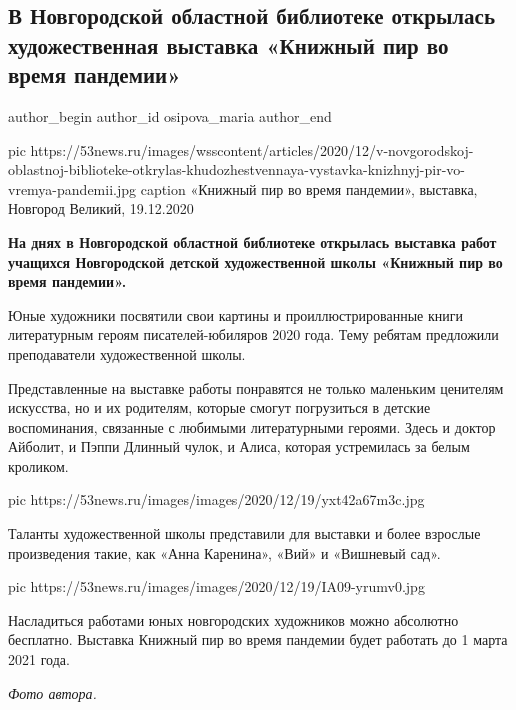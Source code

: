  
 
 
 
 
 
\subsection{В Новгородской областной библиотеке открылась художественная выставка «Книжный пир во время пандемии»}
\label{sec:19_12_2020.news.ru.53news.osipova_maria.1.novgorod_knizhnii_pir_vystavka}
\ifcmt
	author_begin
   author_id osipova_maria
	author_end
\fi

\ifcmt
pic https://53news.ru/images/wsscontent/articles/2020/12/v-novgorodskoj-oblastnoj-biblioteke-otkrylas-khudozhestvennaya-vystavka-knizhnyj-pir-vo-vremya-pandemii.jpg
caption «Книжный пир во время пандемии», выставка, Новгород Великий, 19.12.2020
\fi

\textbf{\large На днях в Новгородской областной библиотеке открылась выставка работ учащихся
Новгородской детской художественной школы «Книжный пир во время пандемии».}

Юные художники посвятили свои картины и проиллюстрированные книги литературным
героям писателей-юбиляров 2020 года. Тему ребятам предложили преподаватели
художественной школы.

Представленные на выставке работы понравятся не только маленьким ценителям
искусства, но и их родителям, которые смогут погрузиться в детские
воспоминания, связанные с любимыми литературными героями. Здесь и доктор
Айболит, и Пэппи Длинный чулок, и Алиса, которая устремилась за белым кроликом.

\ifcmt
pic https://53news.ru/images/images/2020/12/19/yxt42a67m3c.jpg
\fi


Таланты художественной школы представили для выставки и более взрослые
произведения такие, как «Анна Каренина», «Вий» и «Вишневый сад».

\ifcmt
pic https://53news.ru/images/images/2020/12/19/IA09-yrumv0.jpg
\fi

Насладиться работами юных новгородских художников можно абсолютно бесплатно.
Выставка Книжный пир во время пандемии будет работать до 1 марта 2021 года.

\emph{Фото автора.}
